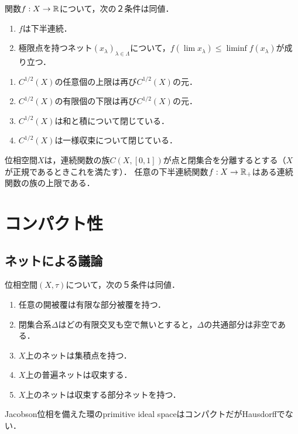 \documentclass[uplatex,dvipdfmx]{jsreport}
\begin{document}
\begin{proposition}[下半連続性の特徴付け]\label{prop-characterization-of-lsc}
    関数$f:X\to\mathbb{R}$について，次の２条件は同値．
    \begin{enumerate}
        \item $f$は下半連続．
        \item 極限点を持つネット$(x_\lambda)_{\lambda\in\Lambda}$について，$f(\lim x_\lambda)\le\liminf f(x_\lambda)$が成り立つ．
    \end{enumerate}
\end{proposition}

\begin{proposition}[下半連続関数の空間は凸錐である]\mbox{}\label{prop-subalgebra-of-lsc-function}
    \begin{enumerate}
        \item $C^{1/2}(X)$の任意個の上限は再び$C^{1/2}(X)$の元．
        \item $C^{1/2}(X)$の有限個の下限は再び$C^{1/2}(X)$の元．
        \item $C^{1/2}(X)$は和と積について閉じている．
        \item $C^{1/2}(X)$は一様収束について閉じている．
    \end{enumerate}
\end{proposition}

\begin{proposition}[下半連続関数の描像]\label{prop-lower-semicontinuous-functions}
    位相空間$X$は，連続関数の族$C(X,[0,1])$が点と閉集合を分離するとする（$X$が正規であるときこれを満たす）．
    任意の下半連続関数$f:X\to\mathbb{R}_+$はある連続関数の族の上限である．
\end{proposition}

\section{コンパクト性}

\subsection{ネットによる議論}

\begin{theorem}[コンパクト性の特徴付け]\label{thm-characterization-of-compactness}
    位相空間$(X,\tau)$について，次の５条件は同値．
    \begin{enumerate}
        \item 任意の開被覆は有限な部分被覆を持つ．
        \item 閉集合系$\Delta$はどの有限交叉も空で無いとすると，$\Delta$の共通部分は非空である．
        \item $X$上のネットは集積点を持つ．
        \item $X$上の普遍ネットは収束する．
        \item $X$上のネットは収束する部分ネットを持つ．
    \end{enumerate}
\end{theorem}
\begin{remark}
    Jacobson位相を備えた環のprimitive ideal spaceはコンパクトだがHausdorffでない．
\end{remark}
\end{document}
